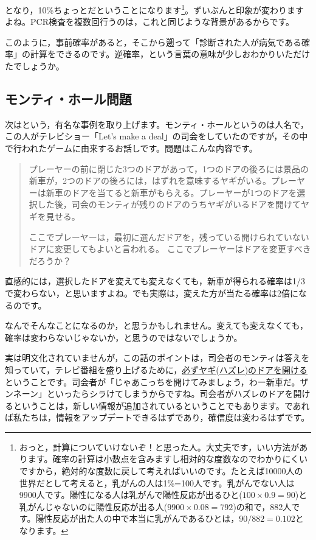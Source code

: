 \documentclass{ltjsbook}
\begin{document}
となり，10\%ちょっとだということになります\footnote{おっと，計算についていけないぞ！と思った人。大丈夫です，いい方法があります。確率の計算は小数点を含みますし相対的な度数なのでわかりにくいですから，絶対的な度数に戻して考えればいいのです。たとえば10000人の世界だとして考えると，乳がんの人は1\%=100人です。乳がんでない人は9900人です。陽性になる人は乳がんで陽性反応が出るひと($100\times0.9=90$)と乳がんじゃないのに陽性反応が出る人($9900\times0.08=792$)の和で，882人です。陽性反応が出た人の中で本当に乳がんであるひとは，$90/882=0.102$となります。}。ずいぶんと印象が変わりますよね。PCR検査を複数回行うのは，これと同じような背景があるからです。

このように，事前確率があると，そこから遡って「診断された人が病気である確率」の計算をできるのです。逆確率，という言葉の意味が少しおわかりいただけたでしょうか。

\subsection{モンティ・ホール問題}

次はという，有名な事例を取り上げます。モンティ・ホールというのは人名で，この人がテレビショー「Let's make a deal」の司会をしていたのですが，その中で行われたゲームに由来するお話しです。問題はこんな内容です。

\begin{quotation}
	プレーヤーの前に閉じた3つのドアがあって，1つのドアの後ろには景品の新車が，2つのドアの後ろには，はずれを意味するヤギがいる。プレーヤーは新車のドアを当てると新車がもらえる。プレーヤーが1つのドアを選択した後，司会のモンティが残りのドアのうちヤギがいるドアを開けてヤギを見せる。

	ここでプレーヤーは，最初に選んだドアを，残っている開けられていないドアに変更してもよいと言われる。
	ここでプレーヤーはドアを変更すべきだろうか？
\end{quotation}

直感的には，選択したドアを変えても変えなくても，新車が得られる確率は1/3で変わらない，と思いますよね。でも実際は，変えた方が当たる確率は2倍になるのです。

なんでそんなことになるのか，と思うかもしれません。変えても変えなくても，確率は変わらないじゃないか，と思うのではないでしょうか。

実は明文化されていませんが，この話のポイントは，司会者のモンティは答えを知っていて，テレビ番組を盛り上げるために，\underline{必ずヤギ(ハズレ)のドアを開ける}ということです。司会者が「じゃあこっちを開けてみましょう，わー新車だ。ザンネーン」といったらシラけてしまうからですね。司会者がハズレのドアを開けるということは，新しい情報が追加されているということでもあります。であれば私たちは，情報をアップデートできるはずであり，確信度は変わるはずです。
\end{document}
